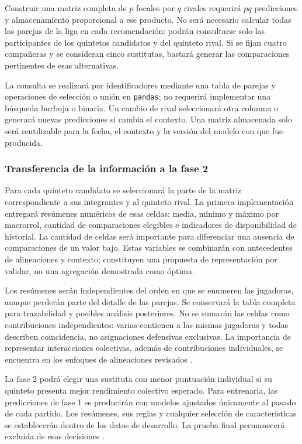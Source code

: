 Construir una matriz completa de $p$ focales por $q$ rivales requerirá $pq$ predicciones y almacenamiento proporcional a ese producto. No será necesario calcular todas las parejas de la liga en cada recomendación: podrán consultarse solo las participantes de los quintetos candidatos y del quinteto rival. Si se fijan cuatro compañeras y se consideran cinco sustitutas, bastará generar las comparaciones pertinentes de esas alternativas.

La consulta se realizará por identificadores mediante una tabla de parejas y operaciones de selección o unión en \texttt{pandas}; no requerirá implementar una búsqueda burbuja o binaria. Un cambio de rival seleccionará otra columna o generará nuevas predicciones si cambia el contexto. Una matriz almacenada solo será reutilizable para la fecha, el contexto y la versión del modelo con que fue producida.

\subsubsection*{Transferencia de la información a la fase 2}
Para cada quinteto candidato se seleccionará la parte de la matriz correspondiente a sus integrantes y al quinteto rival. La primera implementación entregará resúmenes numéricos de esas celdas: media, mínimo y máximo por macrorrol, cantidad de comparaciones elegibles e indicadores de disponibilidad de historial. La cantidad de celdas será importante para diferenciar una ausencia de comparaciones de un valor bajo. Estas variables se combinarán con antecedentes de alineaciones y contexto; constituyen una propuesta de representación por validar, no una agregación demostrada como óptima.

Los resúmenes serán independientes del orden en que se enumeren las jugadoras, aunque perderán parte del detalle de las parejas. Se conservará la tabla completa para trazabilidad y posibles análisis posteriores. No se sumarán las celdas como contribuciones independientes: varias contienen a las mismas jugadoras y todas describen coincidencia, no asignaciones defensivas exclusivas. La importancia de representar interacciones colectivas, además de contribuciones individuales, se encuentra en los enfoques de alineaciones revisados \cite{josephs2025hypergraphadjustedplusminus,yamada2024offensivelineupanalysisbasketball}.

La fase 2 podrá elegir una sustituta con menor puntuación individual si su quinteto presenta mejor rendimiento colectivo esperado. Para entrenarla, las predicciones de fase 1 se producirán con modelos ajustados únicamente al pasado de cada partido. Los resúmenes, sus reglas y cualquier selección de características se establecerán dentro de los datos de desarrollo. La prueba final permanecerá excluida de esas decisiones \cite{cawley2010selection}.

